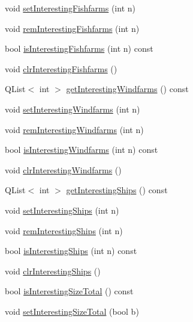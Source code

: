 \begin{DoxyCompactItemize}
\item 
void \mbox{\hyperlink{class_displace_model_afd1a92be0cbe8bbf788678bec863bc99}{set\+Interesting\+Fishfarms}} (int n)
\item 
void \mbox{\hyperlink{class_displace_model_a2bb4601e58a3f9b338ef052602f34c64}{rem\+Interesting\+Fishfarms}} (int n)
\item 
bool \mbox{\hyperlink{class_displace_model_a918b75fbf9102fa236c0f8b725fde575}{is\+Interesting\+Fishfarms}} (int n) const
\item 
void \mbox{\hyperlink{class_displace_model_a1c7df873b696da66908880351b0e13a8}{clr\+Interesting\+Fishfarms}} ()
\item 
Q\+List$<$ int $>$ \mbox{\hyperlink{class_displace_model_a28ea3fda09973f64cbf3bd4a6e863976}{get\+Interesting\+Windfarms}} () const
\item 
void \mbox{\hyperlink{class_displace_model_a4d8d9a832bc056a2ce32bb2b068d452d}{set\+Interesting\+Windfarms}} (int n)
\item 
void \mbox{\hyperlink{class_displace_model_a9ad74a84c8570629d8fb2b7bf3544ad6}{rem\+Interesting\+Windfarms}} (int n)
\item 
bool \mbox{\hyperlink{class_displace_model_a19787ed147d7397e1dc2fa9821cad24e}{is\+Interesting\+Windfarms}} (int n) const
\item 
void \mbox{\hyperlink{class_displace_model_a98750e3acc3d5da707a5ba32699cb2f4}{clr\+Interesting\+Windfarms}} ()
\item 
Q\+List$<$ int $>$ \mbox{\hyperlink{class_displace_model_a09b6463060bca36b2ce783a3bd3f0981}{get\+Interesting\+Ships}} () const
\item 
void \mbox{\hyperlink{class_displace_model_a922238bb83478cd594889eeeffb68914}{set\+Interesting\+Ships}} (int n)
\item 
void \mbox{\hyperlink{class_displace_model_a8f5ff0d004941db5116b9775377c7284}{rem\+Interesting\+Ships}} (int n)
\item 
bool \mbox{\hyperlink{class_displace_model_a39a14000b800c54b065390bb93623181}{is\+Interesting\+Ships}} (int n) const
\item 
void \mbox{\hyperlink{class_displace_model_a5e69fb7114ae216d723bad254688acac}{clr\+Interesting\+Ships}} ()
\item 
bool \mbox{\hyperlink{class_displace_model_a48e218e083b58bc7019c9fdb54a8e5e1}{is\+Interesting\+Size\+Total}} () const
\item 
void \mbox{\hyperlink{class_displace_model_a2be0e9e23c70781ef5570ae73c62b312}{set\+Interesting\+Size\+Total}} (bool b)

\end{DoxyCompactItemize}
